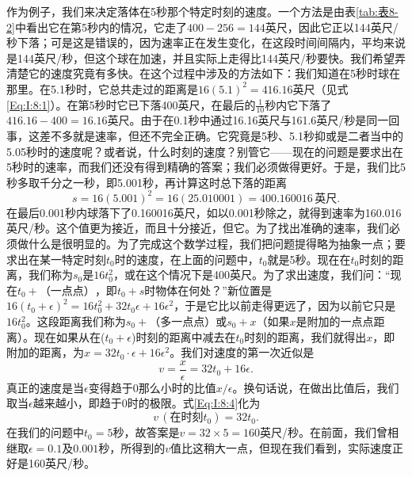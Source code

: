 \documentclass[12pt,oneside]{book}
\begin{document}
作为例子，我们来决定落体在5秒那个特定时刻的速度。一个方法是由表\ref{tab:表8-2}中看出它在第5秒内的情况，它走了$400-256=144$英尺，因此它正以144英尺/秒下落；可是这是错误的，因为速率正在发生变化，在这段时间间隔内，平均来说是144英尺/秒，但这个球在加速，并且实际上走得比144英尺/秒要快。我们希望弄清楚它的速度究竟有多快。在这个过程中涉及的方法如下：我们知道在5秒时球在那里。在5.1秒时，它总共走过的距离是$16(5.1)^2=416.16$英尺（见式\eqref{Eq:I:8:1}）。在第5秒时它已下落400英尺，在最后的$\frac{1}{10}$秒内它下落了$416.16-400=16.16$英尺。由于在0.1秒中通过16.16英尺与161.6英尺/秒是同一回事，这差不多就是速率，但还不完全正确。它究竟是5秒、5.1秒抑或是二者当中的5.05秒时的速度呢？或者说，什么时刻的速度？别管它——现在的问题是要求出在5秒时的速率，而我们还没有得到精确的答案；我们必须做得更好。于是，我们比5秒多取千分之一秒，即5.001秒，再计算这时总下落的距离
\begin{equation*}
s=16(5.001)^2=16(25.010001)=400.160016 \,\textrm{英尺}.
\end{equation*}
在最后0.001秒内球落下了0.160016英尺，如以0.001秒除之，就得到速率为160.016英尺/秒。这个值更为接近，而且十分接近，但它。为了找出准确的速率，我们必须做什么是很明显的。为了完成这个数学过程，我们把问题提得略为抽象一点；要求出在某一特定时刻$t_0$时的速度，在上面的问题中，$t_0$就是5秒。现在在$t_0$时刻的距离，我们称为$s_0$是$16t_0^2$，或在这个情况下是400英尺。为了求出速度，我们问：“现在$t_0+\textrm{（一点点）}$，即$t_0+s$时物体在何处？”新位置是$16(t_0+\epsilon)^2=16t_0^2+32t_0\epsilon+16\epsilon^2$，于是它比以前走得更远了，因为以前它只是$16t_0^2$。这段距离我们称为$s_0+\textrm{（多一点点）}$或$s_0+x$（如果$x$是附加的一点点距离）。现在如果从在($t_0+\epsilon$)时刻的距离中减去在$t_0$时刻的距离，我们就得出$x$，即附加的距离，为$x=32t_0\cdot\epsilon+16\epsilon^2$。我们对速度的第一次近似是
\begin{equation}
\label{Eq:I:8:4}
v=\frac{x}{\epsilon}=32t_0+16\epsilon.
\end{equation}
真正的速度是当$\epsilon$变得趋于0那么小时的比值$x/\epsilon$。换句话说，在做出比值后，我们取当$\epsilon$越来越小，即趋于0时的极限。式\eqref{Eq:I:8:4}化为
\begin{equation*}
v\,(\textrm{在时刻$t_0$})=32t_0.
\end{equation*}
在我们的问题中$t_0=5$秒，故答案是$v=32\times5=160$英尺/秒。在前面，我们曾相继取$\epsilon=0.1$及$0.001$秒，所得到的$v$值比这稍大一点，但现在我们看到，实际速度正好是160英尺/秒。
\end{document}

